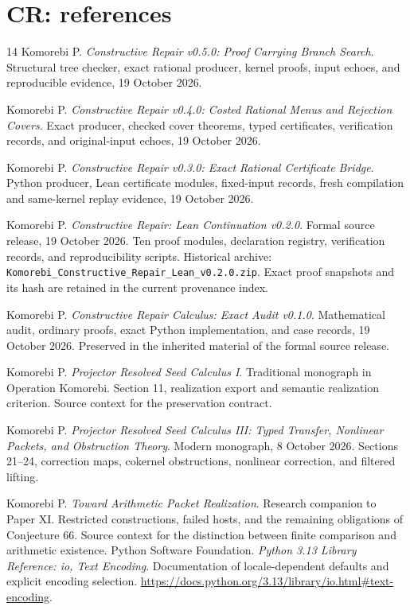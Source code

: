 \documentclass[11pt,oneside,openany]{book}
\numberwithin{equation}{section}
\begin{document}
\chapter{CR: references}
\begin{thebibliography}{14}
Komorebi P. \emph{Constructive Repair v0.5.0: Proof Carrying Branch Search}. Structural tree checker, exact rational producer, kernel proofs, input echoes, and reproducible evidence, 19 October 2026.

Komorebi P. \emph{Constructive Repair v0.4.0: Costed Rational Menus and Rejection Covers}. Exact producer, checked cover theorems, typed certificates, verification records, and original-input echoes, 19 October 2026.

Komorebi P. \emph{Constructive Repair v0.3.0: Exact Rational Certificate Bridge}. Python producer, Lean certificate modules, fixed-input records, fresh compilation and same-kernel replay evidence, 19 October 2026.


Komorebi P. \emph{Constructive Repair: Lean Continuation v0.2.0}. Formal source release, 19 October 2026. Ten proof modules, declaration registry, verification records, and reproducibility scripts. Historical archive: \nolinkurl{Komorebi_Constructive_Repair_Lean_v0.2.0.zip}. Exact proof snapshots and its hash are retained in the current provenance index.

Komorebi P. \emph{Constructive Repair Calculus: Exact Audit v0.1.0}. Mathematical audit, ordinary proofs, exact Python implementation, and case records, 19 October 2026. Preserved in the inherited material of the formal source release.

Komorebi P. \emph{Projector Resolved Seed Calculus I}. Traditional monograph in Operation Komorebi. Section 11, realization export and semantic realization criterion. Source context for the preservation contract.

Komorebi P. \emph{Projector Resolved Seed Calculus III: Typed Transfer, Nonlinear Packets, and Obstruction Theory}. Modern monograph, 8 October 2026. Sections 21--24, correction maps, cokernel obstructions, nonlinear correction, and filtered lifting.

Komorebi P. \emph{Toward Arithmetic Packet Realization}. Research companion to Paper XI. Restricted constructions, failed hosts, and the remaining obligations of Conjecture 66. Source context for the distinction between finite comparison and arithmetic existence.
Python Software Foundation. \emph{Python 3.13 Library Reference: io, Text Encoding}. Documentation of locale-dependent defaults and explicit encoding selection. \url{https://docs.python.org/3.13/library/io.html#text-encoding}.
\end{thebibliography}
\end{document}
